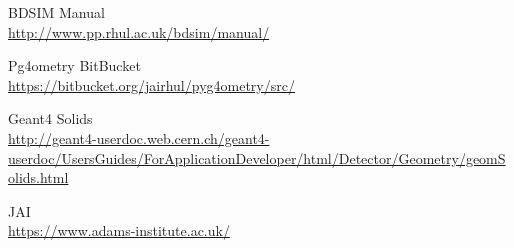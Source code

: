 \documentclass[12pt,a4paper]{article}
\begin{document}
\onecolumn
\newpage
\begin{thebibliography}{1}
	\bibitem{}
		BDSIM Manual\\
		\url{http://www.pp.rhul.ac.uk/bdsim/manual/}
		
	\bibitem{}
		Pg4ometry BitBucket\\
		\url{https://bitbucket.org/jairhul/pyg4ometry/src/}
		
	\bibitem{}
	Geant4 Solids\\
	\url{http://geant4-userdoc.web.cern.ch/geant4-userdoc/UsersGuides/ForApplicationDeveloper/html/Detector/Geometry/geomSolids.html}
	
	\bibitem{}
	JAI\\
	\url{https://www.adams-institute.ac.uk/}
		
		

\end{thebibliography}
\end{document}
